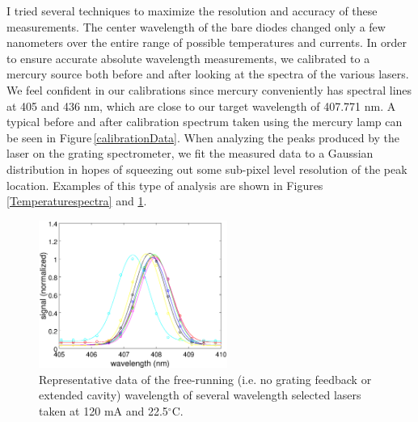 I tried several techniques to maximize the resolution and accuracy of these measurements. The center wavelength of the bare diodes changed only a few nanometers over the entire range of possible temperatures and currents. In order to ensure accurate absolute wavelength measurements, we calibrated to a mercury source both before and after looking at the spectra of the various lasers. We feel confident in our calibrations since mercury conveniently has spectral lines at 405 and 436 nm, which are close to our target wavelength of 407.771 nm. A typical before and after calibration spectrum taken using the mercury lamp can be seen in Figure\,\ref{calibrationData}. When analyzing the peaks produced by the laser on the grating spectrometer, we fit the measured data to a Gaussian distribution in hopes of squeezing out some sub-pixel level resolution of the peak location. Examples of this type of analysis are shown in Figures\,\ref{Temperaturespectra} and \ref{wavelengthselected}.


\begin{figure}
\fontsize{20}{40}\selectfont
\centering
\includegraphics[width=0.55\textwidth]{wavelength_selected.eps} 
\caption[Wavelength of different laser diodes]{\label{wavelengthselected} Representative data of the free-running (i.e. no grating feedback or extended cavity) wavelength of several wavelength selected lasers taken at 120 mA and 22.5$^\circ$C.} %
\end{figure}


